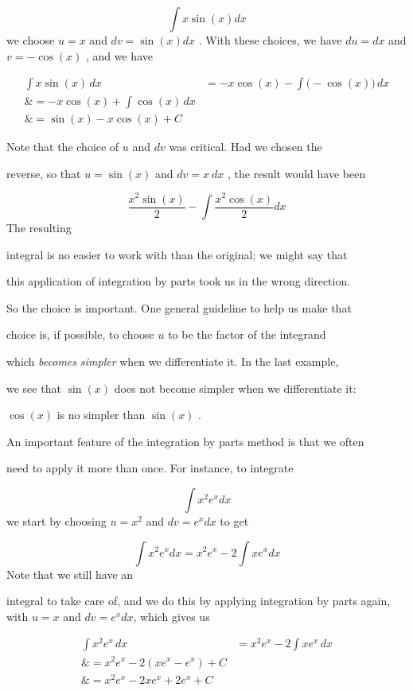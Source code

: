 $$\int x\sin(x)dx$$ we choose $u=x$ and $dv=\sin(x)dx$ . With these choices, we have $du=dx$ and $v=-\cos(x)$ , and we have



\begin{align}
\int x\sin(x)\,dx &= -x\cos(x) - \int\big(-\cos(x)\big)\,dx \\\&= -x\cos(x) + \int\cos(x)\,dx \\\&= \sin(x) - x\cos(x) + C
\end{align}



Note that the choice of $u$ and $dv$ was critical. Had we chosen the

reverse, so that $u=\sin(x)$ and $dv=x\ dx$ , the result would have been



$$\frac{x^2\sin(x)}{2}-\int\frac{x^2\cos(x)}{2}dx$$ The resulting

integral is no easier to work with than the original; we might say that

this application of integration by parts took us in the wrong direction.



So the choice is important. One general guideline to help us make that

choice is, if possible, to choose $u$ to be the factor of the integrand

which \textit{becomes simpler} when we differentiate it. In the last example,

we see that $\sin(x)$ does not become simpler when we differentiate it:

$\cos(x)$ is no simpler than $\sin(x)$ .



An important feature of the integration by parts method is that we often

need to apply it more than once. For instance, to integrate



$$\int x^2e^xdx$$ we start by choosing $u=x^2$ and $dv=e^xdx$ to get



$$\int x^2e^xdx=x^2e^x-2\int xe^xdx$$ Note that we still have an

integral to take care of, and we do this by applying integration by parts again, with $u=x$ and $dv=e^xdx$, which gives us



\begin{align}
\int x^2e^x\,dx &= x^2e^x - 2\int xe^x\,dx \\\&= x^2e^x - 2(xe^x - e^x) + C \\\&= x^2e^x - 2xe^x + 2e^x + C
\end{align}



